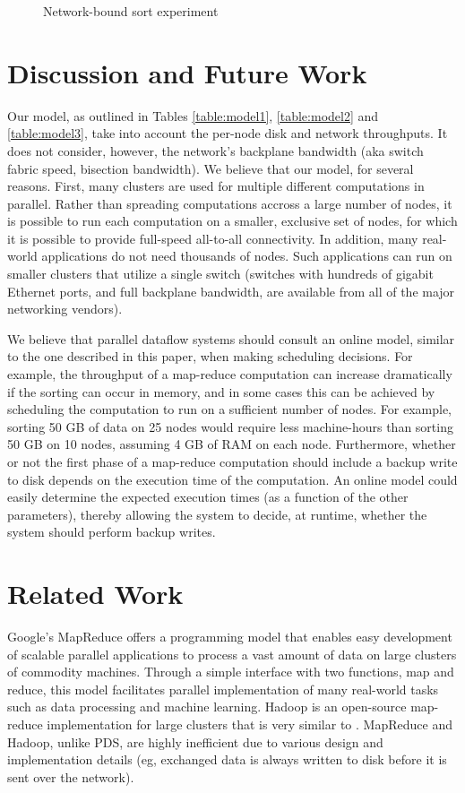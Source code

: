 \documentclass{acm_proc_article-sp}
\begin{document}
\begin{figure}
\caption{Network-bound sort experiment}
\label{fig:sort100experiment}
\end{figure}

\section{Discussion and Future Work}

Our model, as outlined in Tables \ref{table:model1}, \ref{table:model2} and
\ref{table:model3}, take into account the per-node disk and network
throughputs. It does not consider, however, the network's backplane
bandwidth (aka switch fabric speed, bisection bandwidth). We believe that our
model, for several reasons. First, many clusters are used for multiple different
  computations in parallel. Rather than spreading computations accross a large
  number of nodes, it is possible to run each computation on a smaller,
  exclusive set of nodes, for which it is possible to provide full-speed
  all-to-all connectivity. In addition, many real-world applications do not need
  thousands of nodes. Such applications can run on smaller clusters that utilize a single switch
  (switches with hundreds of gigabit Ethernet ports, and full backplane
  bandwidth, are available from all of the major networking vendors).
  
We believe that parallel dataflow systems should consult an online model,
similar to the one described in this paper, when making scheduling decisions.
For example, the throughput of a map-reduce computation can increase
dramatically if the sorting can occur in memory, and in some cases this can be
achieved by scheduling the computation to run on a sufficient number of
nodes. For example, sorting 50 GB of data on 25 nodes would require
less machine-hours than sorting 50 GB on 10 nodes, assuming 4 GB of
RAM on each node. Furthermore, whether or not the first phase of a map-reduce
computation should include a backup write to disk depends on the execution time
of the computation. An online model could easily determine the expected
execution times (as a function of the other parameters), thereby allowing the
system to decide, at runtime, whether the system should perform backup writes.

\section{Related Work}
Google's MapReduce \cite{mapreduce} offers a programming model that enables
easy development of scalable parallel applications to process a vast amount of
data on large clusters of commodity machines. Through a simple interface with
two functions, map and reduce, this model facilitates parallel implementation
of many real-world tasks such as data processing and machine learning. Hadoop
\cite{hadoop} is an open-source map-reduce implementation for large clusters
that is very similar to \cite{mapreduce}. MapReduce and Hadoop, unlike PDS, are
highly inefficient due to various design and implementation details (eg,
exchanged data is always written to disk before it is sent over the network).
\end{document}
